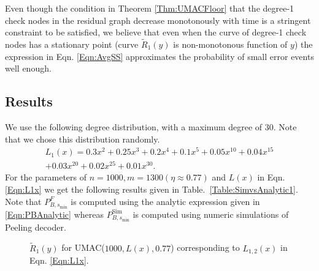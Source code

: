 \begin{remark}
Even though the condition in Theorem \ref{Thm:UMACFloor} that the degree-1 check nodes in the residual graph decrease monotonously with time is a stringent constraint to be satisfied, we believe that even when the curve of degree-1 check nodes has a stationary  point (curve $\tilde{R}_{1}(y)$ is non-monotonous function of $y$) the expression in Eqn. \eqref{Eqn:AvgSS}  approximates the probability of small error events well enough.
\end{remark}

\subsection{Results}
We use the following degree distribution, with a maximum degree of 30. Note that we chose this distribution randomly.
\begin{multline}
L_1(x)=0.3x^2+ 0.25 x^3+ 0.2 x^4 + 0.1 x^5+ 0.05 x^{10} + 0.04 x^{15}\\
 + 0.03 x^{20} + 0.02 x^{25}+ 0.01 x^{30}.
\label{Eqn:L1x}
\end{multline}
For the parameters of $n=1000, m=1300( \eta \approx 0.77)$ and $L(x)$ in Eqn. \eqref{Eqn:L1x} we get the following results given in Table.~\ref{Table:SimvsAnalytic1}. Note that $P_{B,s_{\text{min}}}^F$ is computed using the analytic expression given in \eqref{Eqn:PBAnalytic} whereas $P_{B,s_{\text{min}}}^{\text{Sim}}$ is computed using numeric simulations of Peeling decoder.


\begin{figure}
\centering
\setlength{}
\setlength{}

\caption{$\tilde{R}_{1}(y)$ for UMAC($1000,L(x),0.77$) corresponding to $L_{1,2}(x)$ in Eqn. \eqref{Eqn:L1x}.}
\label{Fig:UMAC_Residual}
\end{figure}

